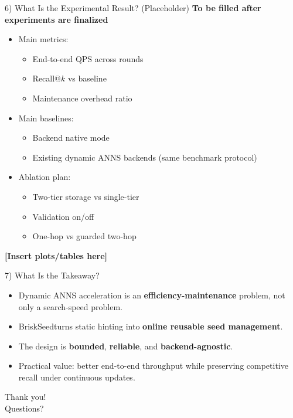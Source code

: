 \documentclass[10pt,aspectratio=169]{beamer}
\newcommand{\system}{BriskSeed}
\begin{document}
\begin{frame}{6) What Is the Experimental Result? (Placeholder)}
  \textbf{To be filled after experiments are finalized}

  \vspace{0.8em}
  \begin{itemize}
    \item Main metrics:
    \begin{itemize}
      \item End-to-end QPS across rounds
      \item Recall@$k$ vs baseline
      \item Maintenance overhead ratio
    \end{itemize}
    \item Main baselines:
    \begin{itemize}
      \item Backend native mode
      \item Existing dynamic ANNS backends (same benchmark protocol)
    \end{itemize}
    \item Ablation plan:
    \begin{itemize}
      \item Two-tier storage vs single-tier
      \item Validation on/off
      \item One-hop vs guarded two-hop
    \end{itemize}
  \end{itemize}

  \vspace{0.8em}
  \centering
  \Large \textbf{[Insert plots/tables here]}
\end{frame}

\begin{frame}{7) What Is the Takeaway?}
  \begin{itemize}
    \item Dynamic ANNS acceleration is an \textbf{efficiency-maintenance} problem, not only a search-speed problem.
    \item \system turns static hinting into \textbf{online reusable seed management}.
    \item The design is \textbf{bounded}, \textbf{reliable}, and \textbf{backend-agnostic}.
    \item Practical value: better end-to-end throughput while preserving competitive recall under continuous updates.
  \end{itemize}

  \vspace{1em}
  \centering
  \Large Thank you! \\ Questions?
\end{frame}
\end{document}
